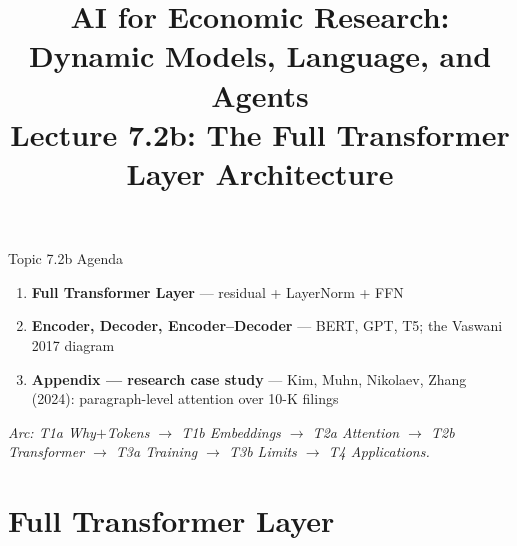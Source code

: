 


\usetikzlibrary{positioning,arrows.meta,shapes,calc,matrix,fit,backgrounds}

\graphicspath{{./pic/}{../../MiniCourse_8hr/Slides/Module3_LLM_Text/pic/}{../}}

\title[AI for Econ Research]{AI for Economic Research: Dynamic Models, Language, and Agents\\
Lecture 7.2b: The Full Transformer Layer Architecture}



\makebeamertitle

\begin{frame}{Topic 7.2b Agenda}
\begin{enumerate}
  \item \textbf{Full Transformer Layer} --- residual + LayerNorm + FFN
  \medskip
  \item \textbf{Encoder, Decoder, Encoder--Decoder} --- BERT, GPT, T5; the Vaswani 2017 diagram
  \medskip
  \item \textbf{Appendix --- research case study} --- Kim, Muhn, Nikolaev, Zhang (2024): paragraph-level attention over 10-K filings
\end{enumerate}

\bigskip
\footnotesize\textit{Arc: T1a Why$+$Tokens $\to$ T1b Embeddings $\to$ T2a Attention $\to$ T2b Transformer $\to$ T3a Training $\to$ T3b Limits $\to$ T4 Applications.}
\end{frame}

\section{Full Transformer Layer}

